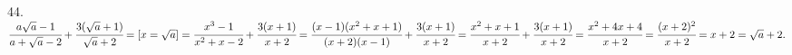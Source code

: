 44. $\cfrac{a\sqrt{a}-1}{a+\sqrt{a}-2}+\cfrac{3(\sqrt{a}+1)}{\sqrt{a}+2}=[x=\sqrt{a}]=
\cfrac{x^3-1}{x^2+x-2}+\cfrac{3(x+1)}{x+2}=\cfrac{(x-1)(x^2+x+1)}{(x+2)(x-1)}+\cfrac{3(x+1)}{x+2}=\cfrac{x^2+x+1}{x+2}+\cfrac{3(x+1)}{x+2}=
\cfrac{x^2+4x+4}{x+2}=\cfrac{(x+2)^2}{x+2}=x+2=\sqrt{a}+2.$\\
